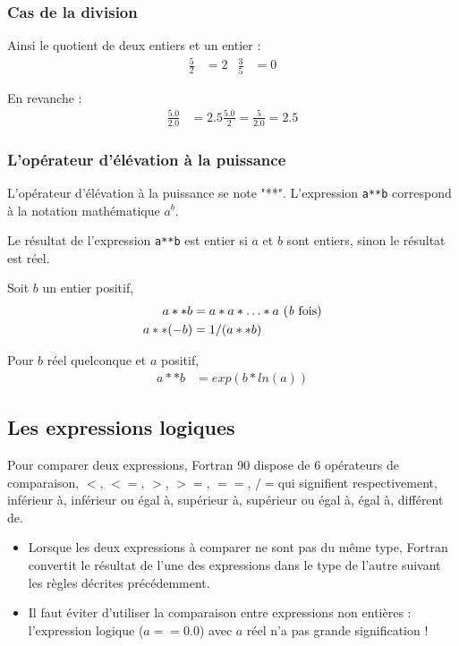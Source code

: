 \documentclass[a4paper,twoside]{article}
\begin{document}
\subsubsection{Cas de la division}
Ainsi le quotient de deux entiers et un entier : 
\begin{align}
\frac{5}{2} &= 2 & \frac{3}{5} &= 0
\end{align}

En revanche :
\begin{align}
\frac{5.0}{2.0} &= 2.5 \frac{5.0}{2} = \frac{5}{2.0} = 2.5
\end{align}

\subsubsection{L'opérateur d'élévation à la puissance}

L'opérateur d'élévation à la puissance se note "**". L'expression \texttt{a**b} correspond à la notation mathé\-ma\-tique $a^{b}$. 

Le résultat de l'expression \texttt{a**b} est entier si $a$ et $b$ sont entiers, sinon le résultat est réel.

Soit $b$ un entier positif, 
\begin{align}
a**b &= a*a*\ldots*a \text{ (\emph{b} fois)}\\
a**(-b) &= 1/(a**b)
\end{align}

Pour $b$ réel quelconque et $a$ positif,
\begin{align}
a**b &= exp(b*ln(a))
\end{align}

\subsection{Les expressions logiques}
Pour comparer deux expressions, Fortran 90 dispose de 6 opérateurs de comparaison, \og $<$\fg, \og $<=$\fg, \og $>$\fg, \og $>=$\fg, \og $==$\fg, \og $/=$\fg qui signifient respectivement, inférieur à, inférieur ou égal à, supérieur à, supérieur ou égal à, égal à, différent de. 

\begin{itemize}
\item Lorsque les deux expressions à comparer ne sont pas du même type, Fortran convertit le résultat de l'une des expressions dans le type de l'autre suivant les règles décrites précédemment.

\item Il faut éviter d'utiliser la comparaison entre expressions non 
entières : l'expression logique ($a == 0.0$) avec $a$ réel n'a pas grande 
signification ! 
\end{itemize}
\end{document}
